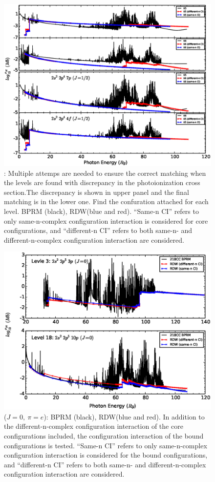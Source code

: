 \begin{figure}
	\centering
		\includegraphics[width=.9\textwidth]{figures/fe18_howtomatch.eps}
	\caption{: Multiple attemps are needed to ensure the correct matching when the levels are found with discrepancy in the photoionization cross section.The discrepancy is shown in upper panel and the final matching is in the lower one. Find the confuration attached for each level. BPRM (black), RDW(blue and red). ``Same-n CI'' refers to only same-n-complex configuration interaction is considered for core configurations, and ``different-n CI'' refers to both same-n- and different-n-complex configuration interaction are considered.}
	\label{fe18_howtomatch}
\end{figure}

\begin{figure}
	\centering
	\includegraphics[width=.9\textwidth]{figures/fe17_bound_mix.eps}
	\caption{ ($J = 0, ~\pi=e$): BPRM (black), RDW(blue and red). In addition to the different-n-complex configuration interaction of the core configurations included, the configuration interaction of the bound configurations is tested.  ``Same-n CI'' refers to only same-n-complex configuration interaction is considered for the bound configurations, and ``different-n CI'' refers to both same-n- and different-n-complex configuration interaction are considered.}
	\label{figure_fe17_bound_mix}
\end{figure}


